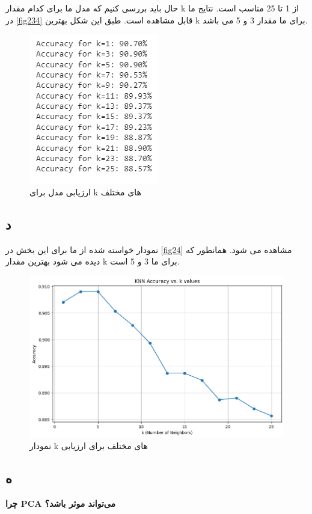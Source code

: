 \documentclass{article}
\begin{document}
حال باید بررسی کنیم که مدل ما برای کدام مقدار k از 1 تا 25 مناسب است. نتایج ما در \autoref{fig234} قابل مشاهده است. طبق این شکل بهترین k برای ما مقدار 3 و 5 می باشد.


\begin{figure}[h!]
    \centering
    \includegraphics[width=0.4\linewidth]{q2_p34.png}
    \caption{ارزیابی مدل برای k های مختلف}
    \label{fig234}
\end{figure}



\subsection{د}

نمودار خواسته شده از ما برای این بخش در \autoref{fig24} مشاهده می شود. همانطور که دیده می شود بهترین مقدار k برای ما 3 و 5 است.

\begin{figure}[h!]
    \centering
    \includegraphics[width=0.6\linewidth]{q2_p4.png}
    \caption{نمودار k های مختلف برای ارزیابی}
    \label{fig24}
\end{figure}


\subsection{ه}


\textbf{ چرا PCA می‌تواند موثر باشد؟}
\end{document}
